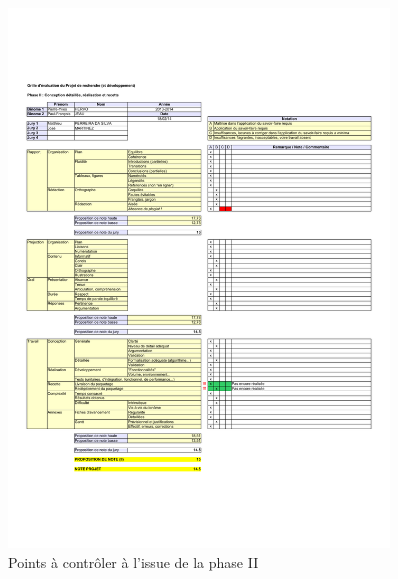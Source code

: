\documentclass[11pt, french]{report-rd-info}
\begin{document}
\begin{figure}
        \includegraphics[width=0.9\textwidth]{Images/Grille-Evaluation-PRD2}
     \fi
	\caption{Points à contrôler à l'issue de la phase II}
	\label{fig:AutoEvaluationTravailFinal}
\end{figure}
\end{document}
